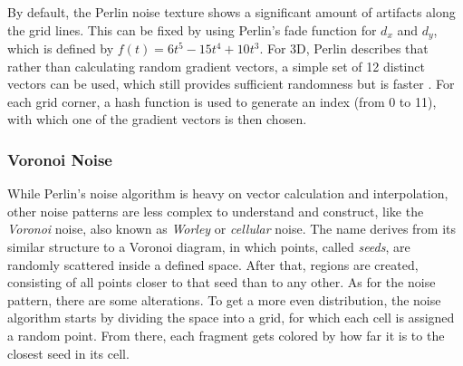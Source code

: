 \noindent
By default, the Perlin noise texture shows a significant amount of artifacts along the grid lines. This can be fixed by using Perlin's fade function \cite{online:perlin:impl} for $d_x$ and $d_y$, which is defined by $f(t) = 6t^5-15t^4+10t^3$.
\emptyline
For 3D, Perlin describes that rather than calculating random gradient vectors, a simple set of 12 distinct vectors can be used, which still provides sufficient randomness but is faster \cite{online:perlin:improved}.
For each grid corner, a hash function is used to generate an index (from 0 to 11), with which one of the gradient vectors is then chosen.


\clearpage
\subsubsection{Voronoi Noise}
While Perlin's noise algorithm is heavy on vector calculation and interpolation, other noise patterns are less complex to understand and construct, like the \textit{Voronoi} noise, also known as \textit{Worley} or \textit{cellular} noise.
The name derives from its similar structure to a Voronoi diagram, in which points, called \textit{seeds}, are randomly scattered inside a defined space. After that, regions are created, consisting of all points closer to that seed than to any other.
\emptyline
As for the noise pattern, there are some alterations. To get a more even distribution, the noise algorithm starts by dividing the space into a grid, for which each cell is assigned a random point. From there, each fragment gets colored by how far it is to the closest seed in its cell.

